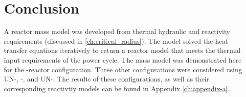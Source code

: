 \section{Conclusion}
A reactor mass model was developed from thermal hydraulic and reactivity
requirements (discussed in \ref{ch:critical_radius}). The model solved the heat
transfer equations iteratively to return a reactor model that meets the thermal
input requirements of the power cycle. The mass model was demonstrated here for
the \uox-\codiox  reactor configuration. Three other configurations were
considered using UN-\codiox, \uox-\water, and UN-\water. The results of these
configurations, as well as their corresponding reactivtiy models can be found in
Appendix \ref{ch:appendix-a}.



